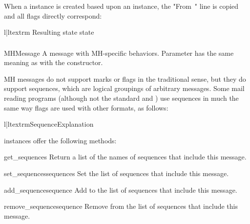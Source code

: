 When a  instance is created based upon an 
instance, the "From~" line is copied and all flags directly correspond:

\begin{tableii}{l|l}{textrm}
    {Resulting state}{ state}
\end{tableii}

\subsubsection{}
\label{mailbox-mhmessage}

\begin{classdesc}{MHMessage}{}
A message with MH-specific behaviors. Parameter  has the same
meaning as with the  constructor.
\end{classdesc}

MH messages do not support marks or flags in the traditional sense, but they do
support sequences, which are logical groupings of arbitrary messages. Some mail
reading programs (although not the standard  and ) use
sequences in much the same way flags are used with other formats, as follows:

\begin{tableii}{l|l}{textrm}{Sequence}{Explanation}
\end{tableii}

 instances offer the following methods:

\begin{methoddesc}{get_sequences}{}
Return a list of the names of sequences that include this message.
\end{methoddesc}

\begin{methoddesc}{set_sequences}{sequences}
Set the list of sequences that include this message.
\end{methoddesc}

\begin{methoddesc}{add_sequence}{sequence}
Add  to the list of sequences that include this message.
\end{methoddesc}

\begin{methoddesc}{remove_sequence}{sequence}
Remove  from the list of sequences that include this message.
\end{methoddesc}

